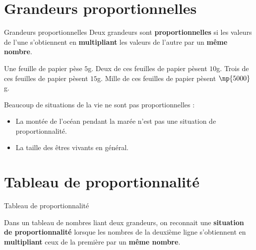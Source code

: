 \begin{pageCours} 

\section{Grandeurs proportionnelles}



\begin{DefT}{Grandeurs proportionnelles} 
Deux grandeurs sont \textbf{proportionnelles} si les valeurs de l'une s'obtiennent en \textbf{multipliant} les valeurs de l'autre par un \textbf{même nombre}.
\end{DefT}


\begin{Ex}

Une feuille de papier pèse $5$g. Deux de ces feuilles de papier pèsent $10$g. Trois de ces feuilles de papier pèsent $15$g.  
Mille de ces feuilles de papier pèsent $\np{5000}$g.  

\end{Ex}



\begin{Att}

Beaucoup de situations de la vie ne sont pas proportionnelles : 
\begin{itemize}[leftmargin=*]
\item La montée de l'océan pendant la marée n'est pas une situation de proportionnalité.
\item La taille des êtres vivants en général.
\end{itemize}
\end{Att}

\section{Tableau de proportionnalité}

\begin{DefT}{Tableau de proportionnalité}

Dans un tableau de nombres liant deux grandeurs, on reconnait une \textbf{situation de proportionnalité} lorsque les nombres de la deuxième ligne s'obtiennent en \textbf{multipliant} ceux de la première par un \textbf{même nombre}.


\end{DefT}
\end{pageCours}
